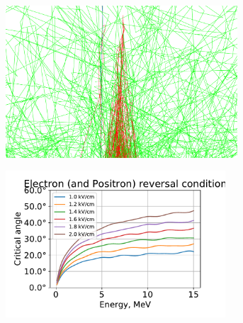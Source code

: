 \documentclass[utf8]{webofc}
\begin{document}
    \newsavebox{\leftpic}
    \begin{figure}[t]\centering
        \sbox{\leftpic}%
        {%
            \begin{subfigure}[b]{0.4\linewidth}\centering
                \includegraphics[width=0.95\textwidth]{pictures/10_dwyer}
                \caption{}\label{pic-dwyer-a}
            \end{subfigure}%
        }
        \usebox{\leftpic}
        \quad %
        \begin{minipage}[b][\ht\leftpic][s]{0.5\linewidth}
            \begin{center}
                \begin{subfigure}[b]{\textwidth}
                    \includegraphics[width=0.9\textwidth]{pictures/09_condition}
                    \caption{}
                    \label{pic-reverse-b}
                \end{subfigure}
                

\end{center}
\end{minipage}
\end{figure}
\end{document}
